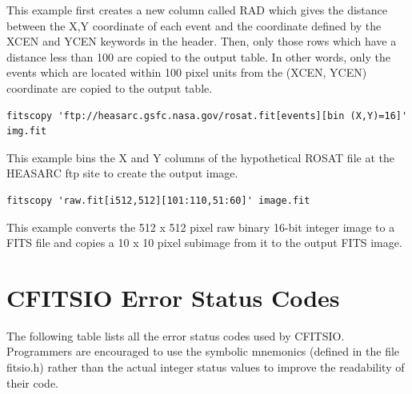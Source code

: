 \documentclass[11pt]{article}
\begin{document}
This example first creates a new column called RAD which gives the
distance between the X,Y coordinate of each event and the coordinate
defined by the XCEN and YCEN keywords in the header.  Then, only those
rows which have a distance less than 100 are copied to the output
table.  In other words, only the events which are located within 100
pixel units from the (XCEN, YCEN) coordinate are copied to the output
table.

\begin{verbatim}
fitscopy 'ftp://heasarc.gsfc.nasa.gov/rosat.fit[events][bin (X,Y)=16]' img.fit
\end{verbatim}

This example bins the X and Y columns of the hypothetical ROSAT file
at the HEASARC ftp site to create the output image.

\begin{verbatim}
fitscopy 'raw.fit[i512,512][101:110,51:60]' image.fit
\end{verbatim}

This example converts the 512 x 512 pixel raw binary 16-bit integer
image to a FITS file and copies a 10 x 10 pixel subimage from it to the
output FITS image.

\newpage
\section{CFITSIO Error Status Codes}

The following table lists all the error status codes used by CFITSIO.
Programmers are encouraged to use the symbolic mnemonics (defined in
the file fitsio.h) rather than the actual integer status values to
improve the readability of their code.
\end{document}
